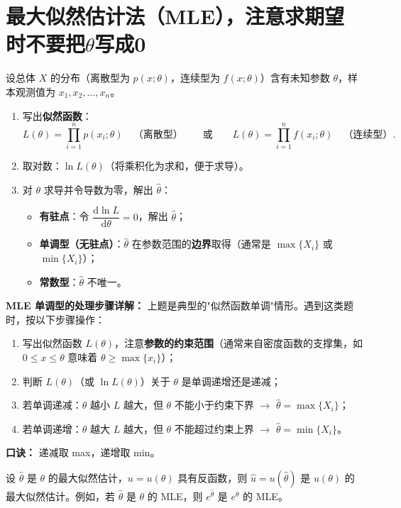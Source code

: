 \documentclass[lang=cn,11pt]{elegantbook}
\begin{document}
\section{最大似然估计法（MLE），注意求期望时不要把$\theta$写成0} \label{subsec:mle}

\begin{property}[最大似然估计的步骤] \label{prop:mle-steps}
设总体 \(X\) 的分布（离散型为 \(p(x;\theta)\)，连续型为 \(f(x;\theta)\)）含有未知参数 \(\theta\)，样本观测值为 \(x_1, x_2, \dots, x_n\)。
\begin{enumerate}
    \item 写出\textbf{似然函数}：
    \[
    L(\theta) = \prod_{i=1}^{n}p(x_i;\theta)\quad\text{（离散型）}\qquad\text{或}\qquad L(\theta) = \prod_{i=1}^{n}f(x_i;\theta)\quad\text{（连续型）}.
    \]
    \item 取对数：\(\ln L(\theta)\)（将乘积化为求和，便于求导）。
    \item 对 \(\theta\) 求导并令导数为零，解出 \(\hat{\theta}\)：
    \begin{itemize}
        \item \textbf{有驻点}：令 \(\dfrac{\mathrm{d}\ln L}{\mathrm{d}\theta} = 0\)，解出 \(\hat{\theta}\)；
        \item \textbf{单调型（无驻点）}：\(\hat{\theta}\) 在参数范围的\textbf{边界}取得（通常是 \(\max\{X_i\}\) 或 \(\min\{X_i\}\)）；
        \item \textbf{常数型}：\(\hat{\theta}\) 不唯一。
    \end{itemize}
\end{enumerate}
\end{property}
\begin{note}
\textbf{MLE 单调型的处理步骤详解：} 上题是典型的"似然函数单调"情形。遇到这类题时，按以下步骤操作：
\begin{enumerate}
    \item 写出似然函数 $L(\theta)$，注意\textbf{参数的约束范围}（通常来自密度函数的支撑集，如 $0\leqslant x\leqslant\theta$ 意味着 $\theta\geqslant\max\{x_i\}$）；
    \item 判断 $L(\theta)$（或 $\ln L(\theta)$）关于 $\theta$ 是单调递增还是递减；
    \item 若单调递减：$\theta$ 越小 $L$ 越大，但 $\theta$ 不能小于约束下界 $\to$ $\hat\theta = \max\{X_i\}$；
    \item 若单调递增：$\theta$ 越大 $L$ 越大，但 $\theta$ 不能超过约束上界 $\to$ $\hat\theta = \min\{X_i\}$。
\end{enumerate}
\textbf{口诀：} 递减取 max，递增取 min。
\end{note}
\begin{property}[最大似然估计的不变性] \label{prop:mle-inv}
设 \(\hat{\theta}\) 是 \(\theta\) 的最大似然估计，\(u = u(\theta)\) 具有反函数，则 \(\hat{u} = u(\hat{\theta})\) 是 \(u(\theta)\) 的最大似然估计。例如，若 \(\hat{\theta}\) 是 \(\theta\) 的 MLE，则 \(e^{\hat{\theta}}\) 是 \(e^\theta\) 的 MLE。
\end{property}
\end{document}
